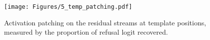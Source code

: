 \begin{figure}[t!]
  \centering
  \texttt{[image: Figures/5\_temp\_patching.pdf]}
  \caption{Activation patching on the residual streams at template positions, measured by the proportion of refusal logit recovered.}
  \label{fig:temp_patching}
\end{figure}
